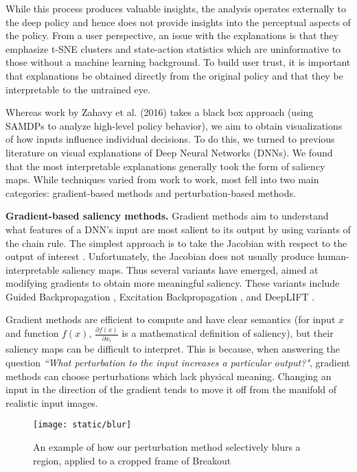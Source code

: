 \documentclass{article}
\begin{document}
While this process produces valuable insights, the analysis operates externally to the deep policy and hence does not provide insights into the perceptual aspects of the policy. From a user perspective, an issue with the explanations is that they emphasize t-SNE clusters and state-action statistics which are uninformative to those without a machine learning background. To build user trust, it is important that explanations be obtained directly from the original policy and that they be interpretable to the untrained eye. 

Whereas work by Zahavy et al. (2016) takes a black box approach (using SAMDPs to analyze high-level policy behavior), we aim to obtain visualizations of how inputs influence individual decisions. To do this, we turned to previous literature on visual explanations of Deep Neural Networks (DNNs). We found that the most interpretable explanations generally took the form of saliency maps. While techniques varied from work to work, most fell into two main categories: gradient-based methods and perturbation-based methods.

\textbf{Gradient-based saliency methods.} Gradient methods aim to understand what features of a DNN's input are most salient to its output by using variants of the chain rule. The simplest approach is to take the Jacobian with respect to the output of interest \cite{Simonyan2014DeepMaps}. Unfortunately, the Jacobian does not usually produce human-interpretable saliency maps. Thus several variants have emerged, aimed at modifying gradients to obtain more meaningful saliency. These variants include Guided Backpropagation \cite{Springenberg2015StrivingNet}, Excitation Backpropagation \cite{Zhang2016Top-downBackprop}, and DeepLIFT \cite{Shrikumar2017LearningDifferences}.

Gradient methods are efficient to compute and have clear semantics (for input $x$ and function $f(x)$, $\frac{\partial f(x)}{\partial x_i}$ is a mathematical definition of saliency), but their saliency maps can be difficult to interpret. This is because, when answering the question \textit{``What perturbation to the input increases a particular output?"}, gradient methods can choose perturbations which lack physical meaning. Changing an input in the direction of the gradient tends to move it off from the manifold of realistic input images.

\begin{figure*}[h!]
\centering
\texttt{[image: static/blur]}
\caption{An example of how our perturbation method selectively blurs a region, applied to a cropped frame of Breakout}
\label{fig:blur}
\end{figure*}
\end{document}
